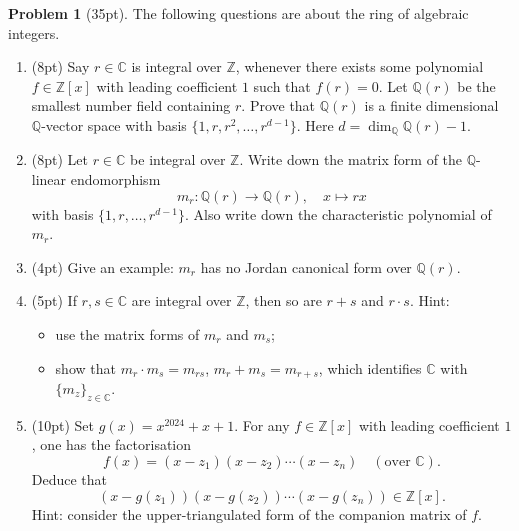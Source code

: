 \documentclass{MainStyle}
\theoremstyle{definition}
\newtheorem{problem}{Problem}
\begin{document}
\begin{problem}[35pt]
The following questions are about the ring of algebraic integers.
\begin{enumerate}
    \item (8pt) Say $r\in \mathbb C$ is integral over $\mathbb Z$, whenever there exists some polynomial $f\in \mathbb Z[x]$ with leading coefficient $1$ such that $f(r)=0$. Let $\mathbb Q(r)$ be the smallest number field containing $r$. Prove that $\mathbb Q(r)$ is a finite dimensional $\mathbb Q$-vector space with basis $\{1,r,r^2,\ldots, r^{d-1}\}$. Here $d=\dim_{\mathbb Q}\mathbb Q(r)-1$.
    \item (8pt) Let $r\in \mathbb C$ be integral over $\mathbb Z$. Write down the matrix form of the $\mathbb Q$-linear endomorphism
          \begin{equation}
              m_r:\mathbb Q(r)\to \mathbb Q(r),\quad x\mapsto rx
          \end{equation}
          with basis $\{1,r,\ldots, r^{d-1}\}$. Also write down the characteristic polynomial of $m_r$.
    \item (4pt) Give an example: $m_r$ has no Jordan canonical form over $\mathbb Q(r)$.
    \item (5pt) If $r,s\in \mathbb C$ are integral over $\mathbb Z$, then so are $r+s$ and $r\cdot s$. Hint:
          \begin{itemize}
              \item use the matrix forms of $m_r$ and $m_s$;
              \item show that $m_r\cdot m_s=m_{rs}$, $m_r+m_s=m_{r+s}$, which identifies $\mathbb C$ with $\{m_z\}_{z\in \mathbb C}$.
          \end{itemize}
    \item (10pt) Set $g(x)=x^{2024}+x+1$. For any $f\in \mathbb Z[x]$ with leading coefficient $1$, one has the factorisation
          \begin{equation}
              f(x)=(x-z_1)(x-z_2)\cdots (x-z_n)\quad (\text{over }\mathbb C).
          \end{equation}
          Deduce that
          \begin{equation}
              (x-g(z_1))(x-g(z_2))\cdots (x-g(z_n))\in \mathbb Z[x].
          \end{equation}
          Hint: consider the upper-triangulated form of the companion matrix of $f$.
\end{enumerate}
\end{problem}
\end{document}
